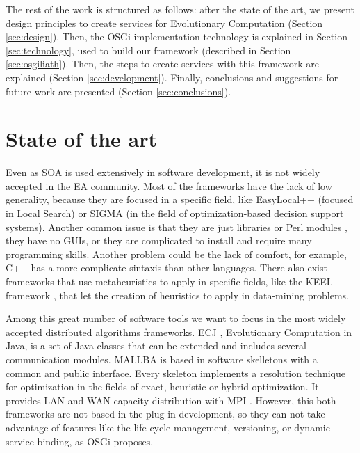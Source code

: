 \documentclass{sig-alternate}
\begin{document}
The rest of the work is structured as follows: after the state of
the art, we present design principles to create services for Evolutionary Computation (Section \ref{sec:design}). Then, the OSGi implementation technology is explained in Section \ref{sec:technology}, used to build our framework (described in Section \ref{sec:osgiliath}). Then, the steps to create services with this framework are explained (Section \ref{sec:development}). Finally, conclusions and suggestions for future work are presented (Section \ref{sec:conclusions}).


%
\section{State of the art}
\label{sec:soa}
%
Even as SOA is used extensively in software development, it is not widely accepted in the EA community. Most of the frameworks have the lack of low generality, because they
are focused in a specific field, like EasyLocal++ \cite{EASYLOCAL} (focused in Local Search) or
SIGMA \cite{SIGMA} (in the field of optimization-based decision support systems). Another common issue is that they are just libraries
 or Perl modules \cite{PERL}, they have no GUIs, or they are complicated to
install and require many programming skills. Another problem could be
the lack of comfort, for example, C++ has a more complicate sintaxis
than other languages. There also exist frameworks that use metaheuristics to apply in specific fields, like the KEEL framework \cite{KEEL}, that let the creation of heuristics to apply in data-mining problems.

Among this great number of software tools we want to focus in the most widely accepted distributed algorithms frameworks. ECJ \cite{ECJ}, Evolutionary Computation in Java, is a set of Java classes that can be extended and includes several communication modules. MALLBA \cite{MALLBA} is based in software skelletons with a common and public interface. Every skeleton implements a resolution technique for optimization in the fields of exact, heuristic or hybrid optimization. It provides LAN and WAN capacity distribution with MPI . However, this both frameworks are not based in the plug-in development, so they can not take advantage of features like the life-cycle management, versioning, or dynamic service binding, as OSGi proposes.
\end{document}
